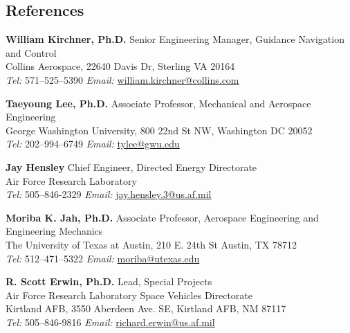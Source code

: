 \subsection*{References}
{}

\textbf{William Kirchner, Ph.D.}
Senior Engineering Manager, Guidance Navigation and Control\\
Collins Aerospace, 22640 Davis Dr, Sterling VA 20164\\
\textit{Tel:} 571--525--5390 \hspace{1cm} \textit{Email:} \href{mailto:william.kirchner@collins.com}{william.kirchner@collins.com}

\textbf{Taeyoung Lee, Ph.D.}
Associate Professor, Mechanical and Aerospace Engineering\\
George Washington University, 800 22nd St NW, Washington DC 20052 \\
\textit{Tel:} 202--994--6749 \hspace{1cm} \textit{Email:} \href{mailto:tylee@gwu.edu}{tylee@gwu.edu}

\textbf{Jay Hensley}
Chief Engineer, Directed Energy Directorate\\
Air Force Research Laboratory\\
\textit{Tel:} 505--846-2329 \hspace{1cm} \textit{Email:} \href{mailto:jay.hensley.3@us.af.mil}{jay.hensley.3@us.af.mil}

\textbf{Moriba K. Jah, Ph.D.}
Associate Professor, Aerospace Engineering and Engineering Mechanics \\
The University of Texas at Austin, 210 E. 24th St Austin, TX 78712 \\
\textit{Tel:} 512--471--5322 \hspace{1cm} \textit{Email:} \href{mailto:moriba@utexas.edu}{moriba@utexas.edu}

\textbf{R. Scott Erwin, Ph.D.}
    Lead, Special Projects\\
Air Force Research Laboratory Space Vehicles Directorate\\
Kirtland AFB, 3550 Aberdeen Ave. SE, Kirtland AFB, NM 87117\\
\textit{Tel:} 505--846-9816 \hspace{1cm} \textit{Email:} \href{mailto:richard.erwin@us.af.mil}{richard.erwin@us.af.mil}
